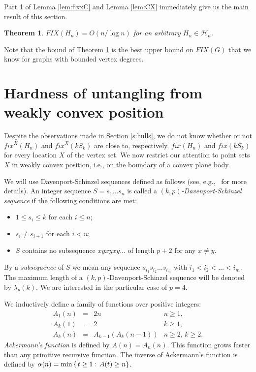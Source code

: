 \documentclass[reqno,12pt]{amsart}
\newtheorem{theorem}{Theorem}[section]
\newcommand{\fix}[1]{\mathit{fix}(#1)}
\newcommand{\setdef}[2]{\left\{ \hspace{0.5mm} #1 : \hspace{0.5mm} #2 \right\}}
\newcommand{\fixx}[1]{\mathit{fix}^X(#1)}
\newcommand{\FIX}[1]{\mathit{FIX}(#1)}
\newcommand{\calH}{{\mathcal H}}
\begin{document}
Part 1 of Lemma \ref{lem:fixxC} and Lemma \ref{lem:CX} immediately give us
the main result of this section.

\begin{theorem}\label{thm:FIXHn}
$\FIX{H_n}=O(n/\log n)$ for an arbitrary $H_n\in\calH_n$.
\end{theorem}

\noindent
Note that the bound of Theorem \ref{thm:FIXHn} is the best upper bound on
$\FIX G$ that we know for graphs with bounded vertex degrees.


\section{Hardness of untangling from weakly convex position}\label{s:weak}

Despite the observations made in Section \ref{s:hulls}, we do not know
whether or not $\fixx{H_n}$ and $\fixx{kS_k}$ are close to, respectively, 
$\fix{H_n}$ and $\fix{kS_k}$ for every location $X$ of the vertex set.
We now restrict our attention to point sets $X$ in weakly convex position,
i.e., on the boundary of a convex plane body.

We will use Davenport-Schinzel sequences defined as follows 
(see, e.g.,~\cite{ASh} for more details).
An integer sequence $S=s_1\ldots s_n$ is called a \emph{$(k,p)$-Davenport-Schinzel
sequence} if the following conditions are met:
\begin{itemize}
\item
$1\le s_i\le k$ for each $i\le n$;
\item
$s_i\ne s_{i+1}$ for each $i < n$;
\item
$S$ contains no subsequence $xyxyxy\ldots$ of length $p+2$ for any $x\ne y$.
\end{itemize}
By a \emph{subsequence} of $S$ we mean any sequence $s_{i_1}s_{i_2}\ldots s_{i_m}$
with $i_1<i_2<\ldots <i_m$.
The maximum length of a $(k,p)$-Davenport-Schinzel sequence will be denoted
by $\lambda_p(k)$. We are interested in the particular case of $p=4$.

We inductively define a family of functions over positive integers:
$$
\begin{array}{llll}
A_1(n)&=&2n&n\ge1,\\
A_k(1)&=&2&k\ge1,\\
A_k(n)&=&A_{k-1}(A_k(n-1))&n\ge2,\,k\ge2.
\end{array}
$$
\emph{Ackermann's function} is defined by $A(n)=A_n(n)$.
This function grows faster than any primitive recursive function.
The inverse of Ackermann's function is defined by
$\alpha(n)=\min\setdef{t\ge1}{A(t)\ge n}$.
\end{document}
